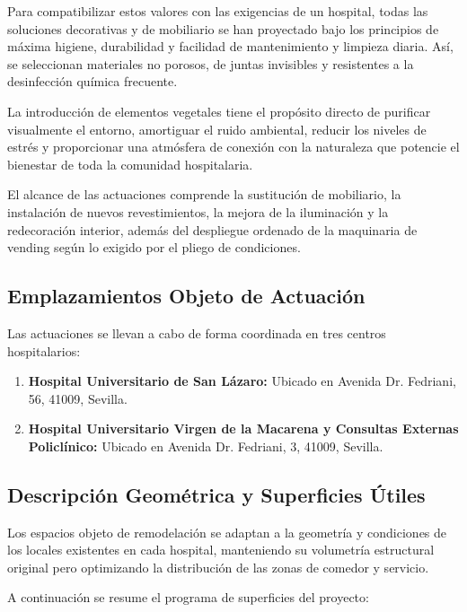 \documentclass[12pt,a4paper]{article}
\newcommand{\todo}[1]{#1}
\begin{document}
Para compatibilizar estos valores con las exigencias de un hospital, todas las soluciones decorativas y de mobiliario se han proyectado bajo los principios de máxima higiene, durabilidad y facilidad de mantenimiento y limpieza diaria. Así, se seleccionan materiales no porosos, de juntas invisibles y resistentes a la desinfección química frecuente.

La introducción de elementos vegetales tiene el propósito directo de purificar visualmente el entorno, amortiguar el ruido ambiental, reducir los niveles de estrés y proporcionar una atmósfera de conexión con la naturaleza que potencie el bienestar de toda la comunidad hospitalaria.

El alcance de las actuaciones comprende la sustitución de mobiliario, la instalación de nuevos revestimientos, la mejora de la iluminación y la redecoración interior, además del despliegue ordenado de la maquinaria de vending según lo exigido por el pliego de condiciones.

\subsection{Emplazamientos Objeto de Actuación}
Las actuaciones se llevan a cabo de forma coordinada en tres centros hospitalarios:
\begin{enumerate}
    \item \textbf{Hospital Universitario de San Lázaro:} Ubicado en \todo{  Avenida Dr. Fedriani, 56, 41009, Sevilla}.
    \item \textbf{Hospital Universitario Virgen de la Macarena y Consultas Externas Policlínico:} Ubicado en \todo{Avenida Dr. Fedriani, 3, 41009, Sevilla}.

\end{enumerate}

\subsection{Descripción Geométrica y Superficies Útiles}
Los espacios objeto de remodelación se adaptan a la geometría y condiciones de los locales existentes en cada hospital, manteniendo su volumetría estructural original pero optimizando la distribución de las zonas de comedor y servicio.

A continuación se resume el programa de superficies del proyecto:
\end{document}
